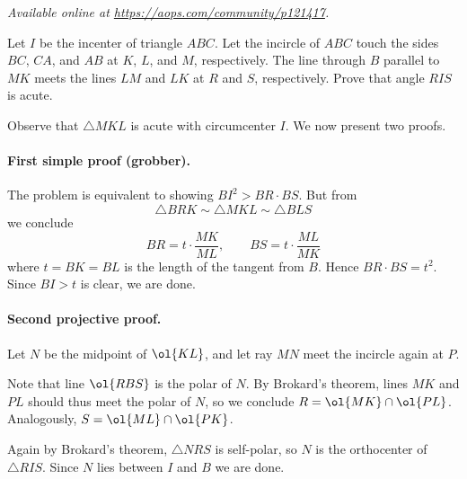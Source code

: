 \textsl{Available online at \url{https://aops.com/community/p121417}.}
\begin{mdframed}[style=mdpurplebox,frametitle={Problem statement}]
Let $I$ be the incenter of triangle $ABC$.
Let the incircle of $ABC$ touch
the sides $BC$, $CA$, and $AB$ at $K$, $L$, and $M$, respectively.
The line through $B$ parallel to $MK$ meets the lines
$LM$ and $LK$ at $R$ and $S$, respectively.
Prove that angle $RIS$ is acute.
\end{mdframed}
Observe that $\triangle MKL$ is acute with circumcenter $I$.
We now present two proofs.

\paragraph{First simple proof (grobber).}
The problem is equivalent to showing $BI^2 > BR \cdot BS$.
But from
\[ \triangle BRK \sim \triangle MKL \sim \triangle BLS \]
we conclude
\[ BR = t \cdot \frac{MK}{ML},
  \qquad BS = t \cdot \frac{ML}{MK} \]
where $t = BK  = BL$ is the length
of the tangent from $B$.
Hence $BR \cdot BS = t^2$.
Since $BI > t$ is clear, we are done.

\paragraph{Second projective proof.}
Let $N$ be the midpoint of $\ol{KL}$,
and let ray $MN$ meet the incircle again at $P$.

Note that line $\ol{RBS}$ is the polar of $N$.
By Brokard's theorem, lines $MK$ and $PL$ should thus
meet the polar of $N$, so we conclude $R = \ol{MK} \cap \ol{PL}$.
Analogously, $S = \ol{ML} \cap \ol{PK}$.

Again by Brokard's theorem, $\triangle NRS$ is self-polar,
so $N$ is the orthocenter of $\triangle RIS$.
Since $N$ lies between $I$ and $B$ we are done.
\pagebreak